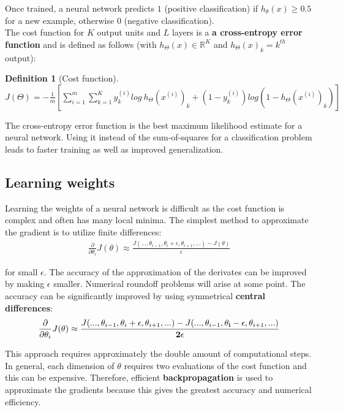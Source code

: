 \documentclass{report}
\newtheorem{definition}{Definition}[section]
\begin{document}
Once trained, a neural network predicts $1$ (positive classification) if $h_\theta(x) \ge 0.5$ for a new example, otherwise $0$ (negative classification). \\

The cost function for $K$ output units and $L$ layers is a {\bf a cross-entropy error function} and is defined as follows (with $h_\Theta(x) \in \mathbb{R}^K$ and $h_\Theta(x)_k = k^{th}$ output):

\begin{definition}[Cost function] ~\\
$J(\Theta) = -\frac{1}{m}[\sum_{i=1}^m \sum_{k=1}^K y_k^{(i)}log\:h_{\Theta}(x^{(i)})_k+(1-y_k^{(i)})log(1-h_{\Theta}(x^{(i)})_k)]$
\end{definition}


The cross-entropy error function is the best maximum likelihood estimate for a neural network.
Using it instead of the sum-of-squares for a classification problem leads to faster training as well as improved generalization.


\subsection{Learning weights}
\label{chapter:learningweights}
Learning the weights of a neural network is difficult as the cost function is complex and often has many local minima.
The simplest method to approximate the gradient is to utilize finite differences:
\begin{align*}
\frac{\partial}{\partial\theta_i}J(\theta)\approx\frac{J(...,\theta_{i-1},\theta_{i}+\epsilon,\theta_{i+1},...)-J(\theta)}{\epsilon}
\end{align*}

for small $\epsilon$. The accuracy of the approximation of the derivates can be improved by making $\epsilon$ smaller.
Numerical roundoff problems will arise at some point.
The accuracy can be significantly improved by using symmetrical {\bf central differences}:
\begin{align*}
\frac{\partial}{\partial\theta_i}J(\theta)\approx\frac{J(...,\theta_{i-1},\theta_{i}+\epsilon,\theta_{i+1},...)-J(...,\theta_{i-1},{\bf \theta_{i}-\epsilon},\theta_{i+1},...)}{{\bf 2}\epsilon}
\end{align*}

This approach requires approximately the double amount of computational steps.
In general, each dimension of $\theta$ requires two evaluations of the cost function and this can be expensive.
Therefore, efficient {\bf backpropagation} is used to approximate the gradients because this gives the greatest accuracy and numerical efficiency.
\end{document}
